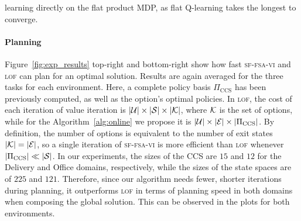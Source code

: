 learning directly on the flat product MDP, as flat Q-learning takes the longest to converge.

\paragraph{Planning} Figure~\ref{fig:exp_results} top-right and bottom-right show how fast \textsc{sf-fsa-vi} and \textsc{lof} can plan for an optimal solution. Results are again averaged for the three tasks for each environment. Here, a complete policy basis $\Pi_\text{CCS}$ has been previously computed, as well as the option's optimal policies.  In \textsc{lof}, the cost of each iteration of value iteration is $\lvert\mathcal{U}\rvert\times\lvert\mathcal{S}\rvert\times \lvert\mathcal{K}\rvert$, where $\mathcal{K}$ is the set of options, while for the Algorithm~\ref{alg:online} we propose it is $\lvert\mathcal{U}\rvert\times\lvert\mathcal{E}\rvert\times\lvert\Pi_\text{CCS}\rvert$. By definition, the number of options is equivalent to the number of exit states $\lvert\mathcal{K}\rvert=\lvert\mathcal{E}\rvert$, so a single iteration of \textsc{sf-fsa-vi} is more efficient than \textsc{lof} whenever $\lvert\Pi_\text{CCS}\rvert \ll \lvert\mathcal{S}\rvert$. In our experiments, the sizes of the CCS are $15$ and $12$ for the Delivery and Office domains, respectively, while the sizes of the state spaces are of $225$ and $121$. Therefore, since our algorithm needs fewer, shorter iterations during planning, it outperforms \textsc{lof} in terms of planning speed in both domains when composing the global solution. This can be observed in the plots for both environments. 

%     
%     

